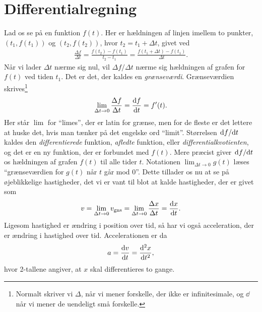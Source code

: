 \section{Differentialregning} \label{mat:sec:diff}
Lad os se på en funktion $f(t)$. Her er hældningen af linjen imellem to punkter, $\left(t_1,f(t_1)\right)$ og $\left(t_2,f(t_2)\right)$, hvor $t_2 = t_1 + \Delta t$, givet ved
%
\begin{align} \label{mat:eq:differenskvotient}
    \frac{\Delta f}{\Delta t}=\frac{f(t_2)-f(t_1)}{t_2-t_1}=\frac{f(t_1+\Delta t)-f(t_1)}{\Delta t}.
\end{align}
%
Når vi lader $\Delta t$ nærme sig nul, vil $\Delta f/\Delta t$ nærme sig hældningen af grafen for $f(t)$ ved tiden $t_1$. Det er det, der kaldes en \emph{grænseværdi}. Grænseværdien skrives\footnote{Normalt skriver vi $\Delta$, når vi mener forskelle, der ikke er infinitesimale, og $\dd{}$ når vi mener de uendeligt små forskelle.}
%
\begin{align} \label{mat:eq:diffkvotient}
    \lim_{\Delta t\rightarrow 0} \frac{\Delta f}{\Delta t} = \dv{f}{t} = f'(t).
\end{align}
%
Her står $\lim$ for ``limes'', der er latin for grænse, men for de fleste er det lettere at huske det, hvis man tænker på det engelske ord ``limit''. Størrelsen $\dv*{f}{t}$ kaldes den \emph{differentierede} funktion, \emph{afledte} funktion, eller \textit{differentialkvotienten}, og det er en ny funktion, der er forbundet med $f(t)$. Mere præcist giver $\dv*{f}{t}$ os hældningen af grafen $f(t)$ til alle tider $t$. Notationen $\displaystyle\lim_{\Delta t\rightarrow 0} g(t)$ læses ``grænseværdien for $g(t)$ når $t$ går mod $0$''.
%
Dette tillader os nu at se på øjeblikkelige hastigheder, det vi er vant til blot at kalde hastigheder, der er givet som
%
\begin{align} \label{mat:eq:hast}
    v = \lim_{\Delta t\rightarrow 0}v_\text{gns} = \lim_{\Delta t\rightarrow 0} \frac{\Delta x}{\Delta t} = \dv{x}{t}.
\end{align}
%
Ligesom hastighed er ændring i position over tid, så har vi også acceleration, der er ændring i hastighed over tid. Accelerationen er da
%
\begin{align} \label{mat:eq:acceleration}
    a=\dv{v}{t}=\dv[2]{x}{t},
\end{align}
%
hvor 2-tallene angiver, at $x$ skal differentieres to gange.

